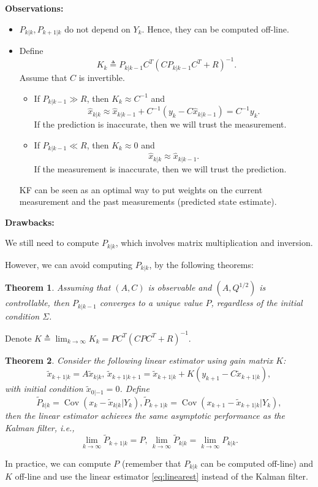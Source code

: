 \documentclass{article}
\newtheorem{theorem}{Theorem}
\DeclareMathOperator{\Cov}{Cov}
\begin{document}
{\bf Observations:}
\begin{itemize}
  \item $P_{k|k}, P_{k+1|k}$ do not depend on $Y_k$. Hence, they can be computed off-line.
  \item Define
    \begin{displaymath}
      K_k \triangleq P_{k|k-1}C^T(CP_{k|k-1}C^T+R)^{-1}. 
    \end{displaymath}
    Assume that $C$ is invertible.
    \begin{itemize}
      \item If $P_{k|k-1}\gg R$, then $K_k\approx C^{-1}$ and
	\begin{displaymath}
	  \hat x_{k|k} \approx \hat x_{k|k-1} + C^{-1} (y_k - C\hat x_{k|k-1}) = C^{-1}y_k.
	\end{displaymath}
	If the prediction is inaccurate, then we will trust the measurement.
      \item If $P_{k|k-1}\ll R$, then $K_k\approx 0$ and
	\begin{displaymath}
	  \hat x_{k|k} \approx \hat x_{k|k-1}.
	\end{displaymath}
	If the measurement is inaccurate, then we will trust the prediction.
    \end{itemize}
    KF can be seen as an optimal way to put weights on the current measurement and the past measurements (predicted state estimate).
\end{itemize}

{\bf Drawbacks:}

We still need to compute $P_{k|k}$, which involves matrix multiplication and inversion.

However, we can avoid computing $P_{k|k}$, by the following theorems:
\begin{theorem}
  Assuming that $(A,C)$ is observable and $(A,Q^{1/2})$ is controllable, then $P_{k|k-1}$ converges to a unique value $P$, regardless of the initial condition $\Sigma$.
\end{theorem}
Denote $K \triangleq \lim_{k\rightarrow\infty}K_k = PC^T(CPC^T+R)^{-1}$.
\begin{theorem}
  Consider the following linear estimator using gain matrix $K$:
  \begin{equation}
    \tilde x_{k+1|k} =  A\tilde x_{k|k},\,\tilde x_{k+1|k+1} = \tilde x_{k+1|k} + K(y_{k+1} - C\tilde x_{k+1|k}),
    \label{eq:linearest}
  \end{equation}
  with initial condition $\tilde x_{0|-1} = 0$. Define
  \begin{displaymath}
    \tilde P_{k|k} = \Cov(x_k-\tilde x_{k|k}|Y_k), \tilde P_{k+1|k} = \Cov(x_{k+1}-\tilde x_{k+1|k}|Y_k),
  \end{displaymath}
  then the linear estimator achieves the same asymptotic performance as the Kalman filter, i.e.,
  \begin{displaymath}
    \lim_{k\rightarrow\infty} \tilde P_{k+1|k} = P ,\, \lim_{k\rightarrow\infty} \tilde P_{k|k} =\lim_{k\rightarrow\infty} P_{k|k} .
  \end{displaymath}
\end{theorem}
In practice, we can compute $P$ (remember that $P_{k|k}$ can be computed off-line) and $K$ off-line and use the linear estimator \eqref{eq:linearest} instead of the Kalman filter.
\end{document}
